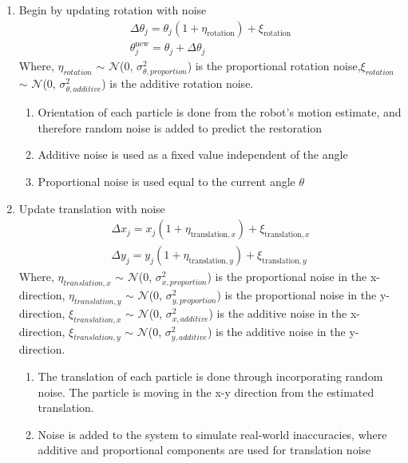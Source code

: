 \begin{enumerate}
    \item Begin by updating rotation with noise
    \begin{align}
        \Delta \theta_j = \theta_j \left( 1 + \eta_{\text{rotation}} \right) + \xi_{\text{rotation}}\\
        \theta_j^{\text{new}} = \theta_j + \Delta \theta_j
    \end{align}
    Where, $\eta_{rotation}$ $\sim$ $\mathcal{N}$(0, $\sigma_{\theta,proportion}^2$) is the proportional rotation noise,$\xi_{rotation}$ $\sim$ $\mathcal{N}$(0, $\sigma_{\theta,additive}^2$) is the additive rotation noise.
    \begin{enumerate}
        \item Orientation of each particle is done from the robot's motion estimate, and therefore random noise is added to predict the restoration
        \item Additive noise is used as a fixed value independent of the angle
        \item Proportional noise is used equal to the current angle $\theta$
    \end{enumerate}
    \item Update translation with noise
    \begin{align}
        \Delta x_j = x_j \left( 1 + \eta_{\text{translation},x} \right) + \xi_{\text{translation},x}\\
        \Delta y_j = y_j \left( 1 + \eta_{\text{translation},y} \right) + \xi_{\text{translation},y}
    \end{align}
    Where, $\eta_{translation,x}$ $\sim$ $\mathcal{N}$(0, $\sigma_{x,proportion}^2$) is the proportional noise in the x-direction,  $\eta_{translation,y}$ $\sim$ $\mathcal{N}$(0, $\sigma_{y,proportion}^2$) is the proportional noise in the y-direction, $\xi_{translation,x}$ $\sim$ $\mathcal{N}$(0, $\sigma_{x,additive}^2$) is the additive noise in the x-direction, $\xi_{translation,y}$ $\sim$ $\mathcal{N}$(0, $\sigma_{y,additive}^2$) is the additive noise in the y-direction.
    \begin{enumerate}
        \item The translation of each particle is done through incorporating random noise. The particle is moving in the x-y direction from the estimated translation.
        \item Noise is added to the system to simulate real-world inaccuracies, where additive and proportional components are used for translation noise

\end{enumerate}
\end{enumerate}
